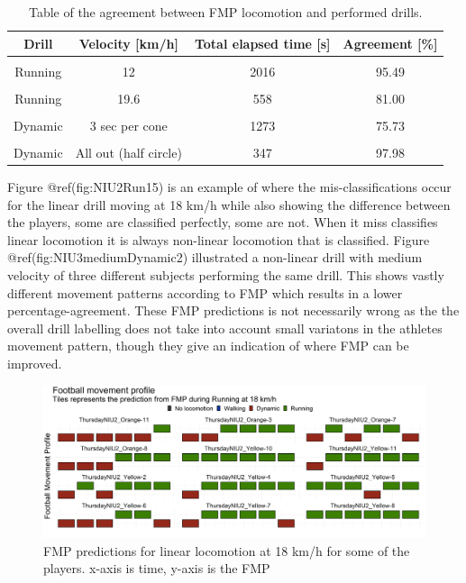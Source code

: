 \documentclass[
]{article}
\begin{document}
\begin{table}[H]

\caption{\label{tab:agreement}Table of the agreement between FMP locomotion and performed drills.}
\centering
\begin{tabular}[t]{c|c|c|c}
\hline
Drill & Velocity [km/h] & Total elapsed time [s] & Agreement [\%]\\
\hline
\cellcolor{gray!6}{Walking} & \cellcolor{gray!6}{5.4} & \cellcolor{gray!6}{3655} & \cellcolor{gray!6}{99.21}\\
\hline
Running & 12 & 2016 & 95.49\\
\hline
\cellcolor{gray!6}{Running} & \cellcolor{gray!6}{18} & \cellcolor{gray!6}{1386} & \cellcolor{gray!6}{88.31}\\
\hline
Running & 19.6 & 558 & 81.00\\
\hline
\cellcolor{gray!6}{Running} & \cellcolor{gray!6}{21.6} & \cellcolor{gray!6}{558} & \cellcolor{gray!6}{74.01}\\
\hline
Dynamic & 3 sec per cone & 1273 & 75.73\\
\hline
\cellcolor{gray!6}{Dynamic} & \cellcolor{gray!6}{All out (full circle)} & \cellcolor{gray!6}{706} & \cellcolor{gray!6}{98.30}\\
\hline
Dynamic & All out (half circle) & 347 & 97.98\\
\hline
\end{tabular}
\end{table}

Figure @ref(fig:NIU2Run15) is an example of where the
mis-classifications occur for the linear drill moving at 18 km/h while
also showing the difference between the players, some are classified
perfectly, some are not. When it miss classifies linear locomotion it is
always non-linear locomotion that is classified. Figure
@ref(fig:NIU3mediumDynamic2) illustrated a non-linear drill with medium
velocity of three different subjects performing the same drill. This
shows vastly different movement patterns according to FMP which results
in a lower percentage-agreement. These FMP predictions is not
necessarily wrong as the the overall drill labelling does not take into
account small variatons in the athletes movement pattern, though they
give an indication of where FMP can be improved.

\begin{figure}

{\centering \includegraphics[width=1\linewidth]{img/Thursday_NIU2_Run15_1} 

}

\caption{FMP predictions for linear locomotion at 18 km/h for some of the players. x-axis is time, y-axis is the FMP}\label{fig:NIU2Run15}
\end{figure}
\end{document}
